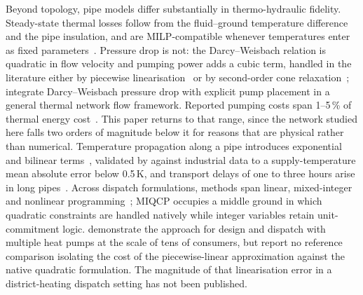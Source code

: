Beyond topology, pipe models differ substantially in thermo-hydraulic fidelity.
Steady-state thermal losses follow from the fluid--ground temperature difference and the
pipe insulation, and are MILP-compatible whenever temperatures enter as fixed
parameters~\cite{Frederiksen2013}. Pressure drop is not: the Darcy--Weisbach relation is
quadratic in flow velocity and pumping power adds a cubic term, handled in the literature
either by piecewise linearisation~\cite{Bordin2016} or by second-order cone
relaxation~\cite{Blommaert2020}; \citet{Hari2024} integrate Darcy--Weisbach pressure drop
with explicit pump placement in a general thermal network flow framework. Reported pumping
costs span 1--5\,\% of thermal energy cost~\cite{Frederiksen2013}. This paper returns to
that range, since the network studied here falls two orders of magnitude below it for
reasons that are physical rather than numerical. Temperature propagation along a pipe
introduces exponential and bilinear terms~\cite{vanderHeijde2017}, validated by
\citet{Maldonado2024} against industrial data to a supply-temperature mean absolute error
below 0.5\,K, and transport delays of one to three hours arise in long
pipes~\cite{Giraud2015}. Across dispatch formulations, methods span linear, mixed-integer
and nonlinear programming~\cite{Ommen2016}; MIQCP occupies a middle ground in which
quadratic constraints are handled natively while integer variables retain
unit-commitment logic. \citet{Hering2021} demonstrate the approach for design and
dispatch with multiple heat pumps at the scale of tens of consumers, but report no
reference comparison isolating the cost of the piecewise-linear approximation against the
native quadratic formulation. The magnitude of that linearisation error in a
district-heating dispatch setting has not been published.


